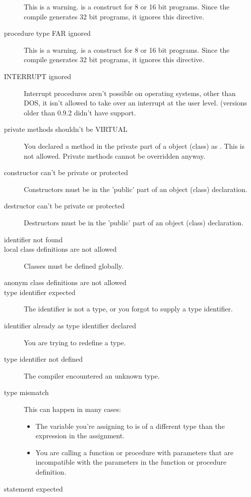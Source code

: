 \documentclass{report}
\begin{document}
\begin{description}
This is a warning.  is a construct for 8 or 16 bit programs. Since
the compile generates 32 bit programs, it ignores this directive.
\item [procedure type FAR ignored]
This is a warning.  is a construct for 8 or 16 bit programs. Since
the compile generates 32 bit programs, it ignores this directive.
\item [INTERRUPT ignored]
Interrupt procedures aren't possible on operating systems, other than DOS, 
it isn't allowed to take over an interrupt at the user level. (versions
older than 0.9.2 didn't have  support.
\item [private methods shouldn't be VIRTUAL]
You declared a method in the private part of a object (class) as
. This is not allowed. Private methods cannot be overridden
anyway.
\item [constructor can't be private or protected]
Constructors must be in the 'public' part of an object (class) declaration. 
\item [destructor can't be private or protected]
Destructors must be in the 'public' part of an object (class) declaration. 
\item [identifier not found]
\item [local class definitions are not allowed]
Classes must be defined globally.
\item [anonym class definitions are not allowed]
\item [type identifier expected]
The identifier is not a type, or you forgot to supply a type identifier.
\item [identifier already as type identifier declared]
You are trying to redefine a type.
\item [type identifier not defined]
The compiler encountered an unknown type.
\item [type mismatch]
This can happen in many cases:
\begin{itemize}
\item The variable you're assigning to is of a different type than the
expression in the assignment.
\item You are calling a function or procedure with parameters that are 
incompatible with the parameters in the function or procedure definition.
\end{itemize}
\item [statement expected]


\end{description}
\end{document}
